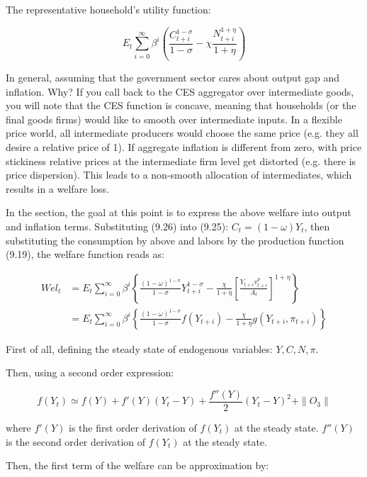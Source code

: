 \documentclass[cn,10pt,math=newtx,citestyle=gb7714-2015,bibstyle=gb7714-2015]{elegantbook}
\begin{document}
	The representative household's utility function:
	
	\begin{equation}
		E_t \sum_{i=0}^{\infty}\beta^i\left(\frac{C_{t+i}^{1-\sigma}}{1-\sigma}-\chi \frac{N_{t+i}^{1+\eta}}{1+\eta}\right)
	\end{equation}
	
	In general, assuming that the government sector cares about output gap and inflation. Why? If you call back to the CES aggregator over intermediate goods, you will note that the CES function is concave, meaning that households (or the final goods firms) would like to smooth over intermediate inputs. In a flexible price world, all intermediate producers would choose the same price (e.g. they all desire a relative price of 1). If aggregate inflation is different from zero, with price stickiness relative prices at the intermediate firm level get distorted (e.g. there is price dispersion). This leads to a non-smooth allocation of intermediates, which results in a welfare loss.
	
	In the section, the goal at this point is to express the above welfare into output and inflation terms. Substituting (9.26) into (9.25): $C_t=(1-\omega)Y_t$, then substituting the consumption by above and labors by the production function (9.19), the welfare function reads as:
	
	\begin{equation*}
		\begin{split}
			Wel_t &=E_t \sum_{i=0}^{\infty}\beta^i\left\{\frac{(1-\omega)^{1-\sigma}}{1-\sigma}Y_{t+i}^{1-\sigma}- \frac{\chi}{1+\eta}\left[\frac{Y_{t+i} v_{t+i}^p }{A_t}\right]^{1+\eta}\right\}\\
			&=E_t \sum_{i=0}^{\infty}\beta^i\left\{\frac{(1-\omega)^{1-\sigma}}{1-\sigma}f(Y_{t+i})-\frac{\chi}{1+\eta}g(Y_{t+i},\pi_{t+i})\right\}
		\end{split}
	\end{equation*}
	
	First of all, defining the steady state of endogenous variables: $Y,C,N,\pi$.
	
	Then, using a second order expression:
	
	$$f(Y_t)\simeq f(Y)+ f'(Y)(Y_t-Y)+\frac{f''(Y)}{2}(Y_t-Y)^2+\parallel O_3\parallel$$
	
	where $f'(Y)$ is the first order derivation of $f(Y_t)$ at the steady state. $f''(Y)$ is the second order derivation of $f(Y_t)$ at the steady state.
	
	Then, the first term of the welfare can be approximation by:
	
\end{document}
